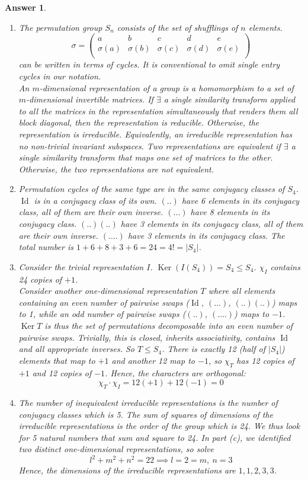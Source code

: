 \documentclass[a4paper]{article}
\DeclareMathOperator{\Ker}{Ker}
\DeclareMathOperator{\Id}{Id}
\newtheorem{ans}{Answer}[section]
\theoremstyle{new}
\begin{document}
\begin{ans}\leavevmode
\begin{enumerate}[label=(\alph*)]
\item The permutation group $S_n$ consists of the set of shufflings of $n$ elements.
$$\sigma=\begin{pmatrix}a&b&c&d&e\\\sigma(a)&\sigma(b)&\sigma(c)&\sigma(d)&\sigma(e)\\\end{pmatrix}$$
can be written in terms of cycles. It is conventional to omit single entry cycles in our notation.\\[5pt]
An $m$-dimensional representation of a group is a homomorphism to a set of $m$-dimensional invertible matrices. If $\exists$ a single similarity transform applied to all the matrices in the representation simultaneously that renders them all block diagonal, then the representation is reducible. Otherwise, the representation is irreducible. Equivalently, an irreducible representation has no non-trivial invariant subspaces. Two representations are equivalent if $\exists$ a single similarity transform that maps one set of matrices to the other. Otherwise, the two representations are not equivalent.
\item Permutation cycles of the same type are in the same conjugacy classes of $S_4$. $\Id$ is in a conjugacy class of its own. $(..)$ have 6 elements in its conjugacy class, all of them are their own inverse. $(...)$ have 8 elements in its conjugacy class. $(..)(..)$ have 3 elements in its conjugacy class, all of them are their own inverse. $(....)$ have 3 elements in its conjugacy class. The total number is $1+6+8+3+6=24=4!=|S_4|$.
\item Consider the trivial representation $I$. $\Ker(I(S_4))=S_4\leq S_4$. $\chi_I$ contains 24 copies of $+1$.\\[5pt]
Consider another one-dimensional representation $T$ where all elements containing an even number of pairwise swaps ($\Id$, $(...)$, $(..)(..)$) maps to 1, while an odd number of pairwise swaps ($(..)$, $(....)$) maps to $-1$. $\Ker T$ is thus the set of permutations decomposable into an even number of pairwise swaps. Trivially, this is closed, inherits associativity, contains $\Id$ and all appropriate inverses. So $T\leq S_4$. There is exactly 12 (half of $|S_4|$) elements that map to $+1$ and another 12 map to $-1$, so $\chi_T$ has 12 copies of $+1$ and 12 copies of $-1$. Hence, the characters are orthogonal:
$$\chi_T\cdot\chi_I=12(+1)+12(-1)=0$$
\item The number of inequivalent irreducible representations is the number of conjugacy classes which is 5. The sum of squares of dimensions of the irreducible representations is the order of the group which is 24. We thus look for 5 natural numbers that sum and square to 24. In part (c), we identified two distinct one-dimensional representations, so solve
$$l^2+m^2+n^2=22\implies l=2=m,~n=3$$
Hence, the dimensions of the irreducible representations are $1,1,2,3,3$.

\end{enumerate}
\end{ans}
\end{document}
